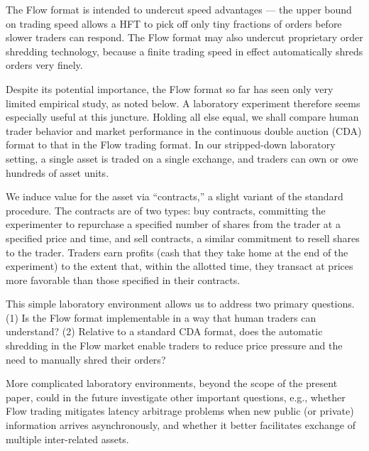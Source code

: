 \documentclass[12pt]{article}
\begin{document}
The Flow format is intended to undercut speed advantages --- the upper bound on trading speed allows a HFT to pick off only tiny fractions of orders before slower traders can respond. 
The Flow format may also undercut proprietary order shredding technology, because a finite trading speed in effect automatically  shreds orders very finely. 

Despite its potential importance, the Flow format so far has seen only very limited empirical study, as noted below. 
A laboratory experiment therefore seems especially useful at this juncture. 
Holding all else equal, we shall compare human trader behavior and market performance in the continuous double auction (CDA) format to that in the  Flow trading format. In our stripped-down laboratory setting, a single asset is traded on a single exchange, and traders can own or owe hundreds of asset units. 

We induce value for the asset via ``contracts,'' a slight variant of the standard procedure.  
The contracts are of two types: buy contracts, committing the experimenter to repurchase a specified number of shares from the trader at a specified price and time, and sell contracts, a similar commitment to resell shares to the trader. Traders earn profits (cash that they take home at the end of the experiment) to the extent that,
within the allotted time,
they transact at prices more favorable than those specified in their contracts.

This simple laboratory environment allows us to address two primary questions.
(1) Is the Flow format implementable in a way that human traders can understand?
(2) Relative to a standard CDA format, does the automatic   shredding in the Flow market enable traders to reduce price pressure and the need to manually shred their orders?

More complicated laboratory environments, beyond the scope of the present paper, could in the future investigate other important questions, e.g., whether Flow trading mitigates latency arbitrage problems when new public (or private) information arrives asynchronously, and whether
it better facilitates exchange of multiple inter-related assets.

 
\end{document}
